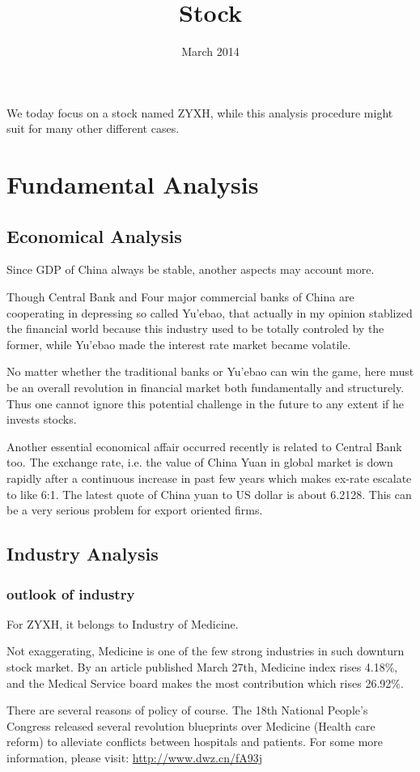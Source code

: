 \documentclass{article}
\title{Stock}
\date{March 2014}
\begin{document}
We today focus on a stock named ZYXH, while this analysis procedure might suit for many other different cases.
\section{Fundamental Analysis}
\subsection{Economical Analysis}
Since GDP of China always be stable, another aspects may account more.

Though Central Bank and Four major commercial banks of China are cooperating in depressing so called Yu'ebao, that actually in my opinion stablized the financial world because this industry used to be totally controled by the former, while Yu'ebao made the interest rate market became volatile. 

No matter whether the traditional banks or Yu'ebao can win the game, here must be an overall revolution in financial market both fundamentally and structurely. Thus one cannot ignore this potential challenge in the future to any extent if he invests stocks.

Another essential economical affair occurred recently is related to Central Bank too. The exchange rate, i.e. the value of China Yuan in global market is down rapidly after a continuous increase in past few years which makes ex-rate escalate to like 6:1. The latest quote of China yuan to US dollar is about 6.2128. This can be a very serious problem for export oriented firms.

\subsection{Industry Analysis}
\subsubsection{outlook of industry}

For ZYXH, it belongs to Industry of Medicine. 

Not exaggerating, Medicine is one of the few strong industries in such downturn stock market. By an article published March 27th, Medicine index rises 4.18\%, and the Medical Service board makes the most contribution which rises 26.92\%.

There are several reasons of policy of course. The 18th National People's Congress released several revolution blueprints over Medicine (Health care reform) to alleviate conflicts between hospitals and patients. For some more information, please visit: \url{http://www.dwz.cn/fA93j}
\end{document}
